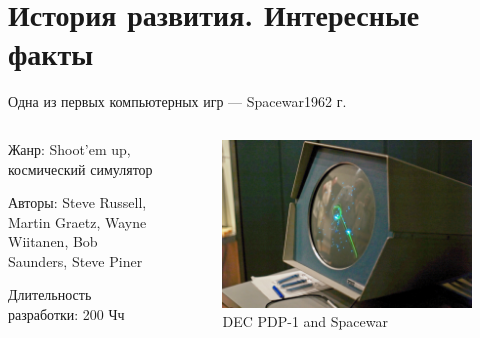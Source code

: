 \documentclass{beamer}
\begin{document}
	\section{История развития. Интересные факты}
	
	\begin{frame}{Одна из первых компьютерных игр --- Spacewar}{1962 г.}
	
	\begin{columns}
		
		\begin{column}{0.5\textwidth}
			
			
			Жанр: Shoot’em up, космический симулятор
			
			Авторы: Steve Russell, Martin Graetz, Wayne Wiitanen, Bob Saunders, Steve Piner
			
			
			Длительность разработки: 200 Чч
			
		\end{column}
		\begin{column}{0.5\textwidth}
			\begin{figure} 
			\includegraphics[width=\textwidth]{images/Spacewar.png}
			\caption {DEC PDP-1 and Spacewar}
			\end{figure}
		\end{column}
		
	\end{columns}
	
\end{frame}
\end{document}

